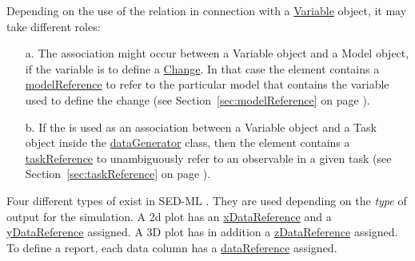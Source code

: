 Depending on the use of the  relation in connection with a \hyperref[class:variable]{Variable} object, it may take different roles: 
\begin{enumerate}
\item[a.]{The  association might occur between a Variable object and a Model object, if the variable is to define a \hyperref[class:change]{Change}. 
In that case the  element contains a \hyperref[sec:modelReference]{modelReference} to refer to the particular model that contains the variable used to define the change (see Section~\ref{sec:modelReference} on page \pageref{sec:modelReference}). }
\item[b.]{If the  is used as an association between a Variable object and a Task object  inside the \hyperref[class:dataGenerator]{dataGenerator} class, then the  element contains a \hyperref[sec:taskReference]{taskReference} to unambiguously refer to an observable in a given task (see Section~\ref{sec:taskReference} on page \pageref{sec:taskReference}).}
\end{enumerate}

Four different types of  exist in SED-ML \LoneVtwo. They are used depending on the \emph{type} of output for the simulation. A 2d plot has an \hyperref[sec:xDataReference]{xDataReference} and a \hyperref[sec:yDataReference]{yDataReference} assigned. A 3D plot has in addition a \hyperref[sec:zDataReference]{zDataReference} assigned. To define a report, each data column has a \hyperref[sec:dataReference1]{dataReference} assigned.










